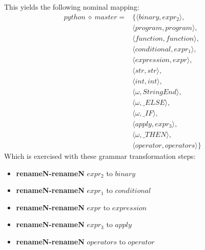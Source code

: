 This yields the following nominal mapping:
\begin{align*}\mathit{python} \:\diamond\: \mathit{master} =& \{\langle \mathit{binary},\mathit{expr_2}\rangle,\\
 & \langle \mathit{program},\mathit{program}\rangle,\\
 & \langle \mathit{function},\mathit{function}\rangle,\\
 & \langle \mathit{conditional},\mathit{expr_1}\rangle,\\
 & \langle \mathit{expression},\mathit{expr}\rangle,\\
 & \langle str,str\rangle,\\
 & \langle int,int\rangle,\\
 & \langle \omega,\mathit{StringEnd}\rangle,\\
 & \langle \omega,\mathit{\_ ELSE}\rangle,\\
 & \langle \omega,\mathit{\_ IF}\rangle,\\
 & \langle \mathit{apply},\mathit{expr_3}\rangle,\\
 & \langle \omega,\mathit{\_ THEN}\rangle,\\
 & \langle \mathit{operator},\mathit{operators}\rangle\}\end{align*}
 Which is exercised with these grammar transformation steps:

{\footnotesize\begin{itemize}
\item \textbf{renameN-renameN} $\mathit{expr_2}$ to $\mathit{binary}$
\item \textbf{renameN-renameN} $\mathit{expr_1}$ to $\mathit{conditional}$
\item \textbf{renameN-renameN} $\mathit{expr}$ to $\mathit{expression}$
\item \textbf{renameN-renameN} $\mathit{expr_3}$ to $\mathit{apply}$
\item \textbf{renameN-renameN} $\mathit{operators}$ to $\mathit{operator}$
\end{itemize}}

